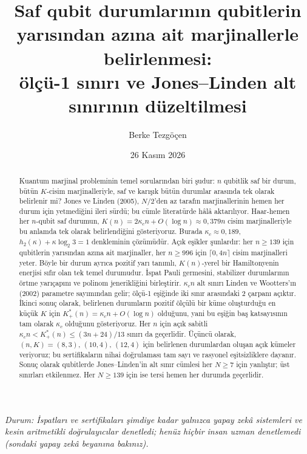 \documentclass[aps,pra,onecolumn,superscriptaddress,nofootinbib,longbibliography,10pt]{revtex4-2}
\theoremstyle{definition}
\newcommand{\kc}{\kappa_c}
\newcommand{\Kp}{K^{*}_{+}}
\begin{document}
\title{Saf qubit durumlarının qubitlerin yarısından azına ait marjinallerle belirlenmesi:\\ ölçü-1 sınırı ve Jones--Linden alt sınırının düzeltilmesi}

\author{Berke Tezgöçen}

\date{26 Kasım 2026}

\begin{abstract}
Kuantum marjinal probleminin temel sorularından biri şudur: $n$ qubitlik saf bir durum, bütün $K$-cisim marjinalleriyle, saf ve karışık bütün durumlar arasında tek olarak belirlenir mi? Jones ve Linden (2005), $N/2$'den az tarafın marjinallerinin hemen her durum için yetmediğini ileri sürdü; bu cümle literatürde hâlâ aktarılıyor. Haar-hemen her $n$-qubit saf durumun, $K(n)=2\kc n+O(\log n)\approx0{,}379n$ cisim marjinalleriyle bu anlamda tek olarak belirlendiğini gösteriyoruz. Burada $\kc\approx0{,}189$, $h_2(\kappa)+\kappa\log_2 3=1$ denkleminin çözümüdür. Açık eşikler şunlardır: her $n\ge139$ için qubitlerin yarısından azına ait marjinaller, her $n\ge996$ için $\lceil0{,}4n\rceil$ cisim marjinalleri yeter. Böyle bir durum ayrıca pozitif yarı tanımlı, $K(n)$-yerel bir Hamiltonyenin enerjisi sıfır olan tek temel durumudur. İspat Pauli germesini, stabilizer durumlarının örtme yarıçapını ve polinom jenerikliğini birleştirir. $\kc n$ alt sınırı Linden ve Wootters'ın (2002) parametre sayımından gelir; ölçü-1 eşiğinde iki sınır arasındaki 2 çarpanı açıktır.
İkinci sonuç olarak, belirlenen durumların pozitif ölçülü bir küme oluşturduğu en küçük $K$ için $\Kp(n)=\kc n+O(\log n)$ olduğunu, yani bu eşiğin baş katsayısının tam olarak $\kc$ olduğunu gösteriyoruz. Her $n$ için açık sabitli $\kc n<\Kp(n)\le(3n+24)/13$ sınırı da geçerlidir. Üçüncü olarak, $(n, K)=(8, 3)$, $(10, 4)$, $(12, 4)$ için belirlenen durumlardan oluşan açık kümeler veriyoruz; bu sertifikaların nihai doğrulaması tam sayı ve rasyonel eşitsizliklere dayanır.
Sonuç olarak qubitlerde Jones--Linden'in alt sınır cümlesi her $N\ge7$ için yanlıştır; üst sınırları etkilenmez. Her $N\ge139$ için ise tersi hemen her durumda geçerlidir.
\end{abstract}

\maketitle

\noindent\textit{Durum: İspatları ve sertifikaları şimdiye kadar yalnızca yapay zekâ sistemleri ve kesin aritmetikli doğrulayıcılar denetledi; henüz hiçbir insan uzman denetlemedi (sondaki yapay zekâ beyanına bakınız).}
\end{document}
